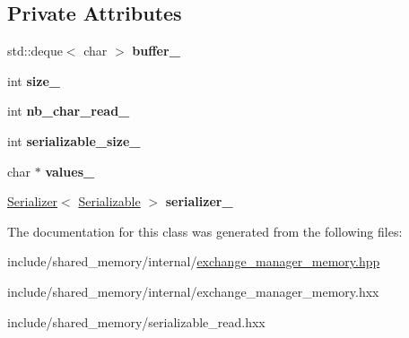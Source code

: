 \subsection*{Private Attributes}
\begin{DoxyCompactItemize}
\item 
std\+::deque$<$ char $>$ {\bfseries buffer\+\_\+}\hypertarget{classshared__memory_1_1internal_1_1Serialized__read_a2bf4782bcdbbf8a415309b82e9b333c6}{}\label{classshared__memory_1_1internal_1_1Serialized__read_a2bf4782bcdbbf8a415309b82e9b333c6}

\item 
int {\bfseries size\+\_\+}\hypertarget{classshared__memory_1_1internal_1_1Serialized__read_acb1db67ffcae257bb009c16726abcbb7}{}\label{classshared__memory_1_1internal_1_1Serialized__read_acb1db67ffcae257bb009c16726abcbb7}

\item 
int {\bfseries nb\+\_\+char\+\_\+read\+\_\+}\hypertarget{classshared__memory_1_1internal_1_1Serialized__read_ae8f179745a0e9c95668c08a092d291ee}{}\label{classshared__memory_1_1internal_1_1Serialized__read_ae8f179745a0e9c95668c08a092d291ee}

\item 
int {\bfseries serializable\+\_\+size\+\_\+}\hypertarget{classshared__memory_1_1internal_1_1Serialized__read_a540b0e3a8a12d0167b828010fd7fde3e}{}\label{classshared__memory_1_1internal_1_1Serialized__read_a540b0e3a8a12d0167b828010fd7fde3e}

\item 
char $\ast$ {\bfseries values\+\_\+}\hypertarget{classshared__memory_1_1internal_1_1Serialized__read_ad267ed8416105a705c1afabd16cb941b}{}\label{classshared__memory_1_1internal_1_1Serialized__read_ad267ed8416105a705c1afabd16cb941b}

\item 
\hyperlink{classshared__memory_1_1Serializer}{Serializer}$<$ \hyperlink{classSerializable}{Serializable} $>$ {\bfseries serializer\+\_\+}\hypertarget{classshared__memory_1_1internal_1_1Serialized__read_a507ecb659494a31ae4d4744967bcf78d}{}\label{classshared__memory_1_1internal_1_1Serialized__read_a507ecb659494a31ae4d4744967bcf78d}

\end{DoxyCompactItemize}


The documentation for this class was generated from the following files\+:\begin{DoxyCompactItemize}
\item 
include/shared\+\_\+memory/internal/\hyperlink{exchange__manager__memory_8hpp}{exchange\+\_\+manager\+\_\+memory.\+hpp}\item 
include/shared\+\_\+memory/internal/exchange\+\_\+manager\+\_\+memory.\+hxx\item 
include/shared\+\_\+memory/serializable\+\_\+read.\+hxx\end{DoxyCompactItemize}
